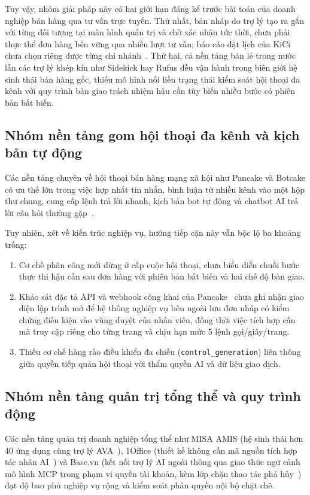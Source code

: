 Tuy vậy, nhóm giải pháp này có hai giới hạn đáng kể trước bài toán của doanh nghiệp bán hàng qua tư vấn trực tuyến. Thứ nhất, bản nháp do trợ lý tạo ra gắn với từng đối tượng tại màn hình quản trị và chờ xác nhận tức thời, chưa phải thực thể đơn hàng
bền vững qua nhiều lượt tư vấn; báo cáo đặt lịch của KiCi chưa chọn riêng được từng chi nhánh~\cite{kiotviet-kici}. Thứ hai, cả nền tảng bán lẻ trong nước
lẫn các trợ lý khép kín như Sidekick hay Rufus đều vận hành trong biên giới hệ sinh thái bán hàng gốc, thiếu mô hình nối liền trạng thái kiểm soát hội thoại đa kênh với quy trình bàn giao trách
nhiệm hậu cần tùy biến nhiều bước có phiên bản bất biến.

\subsection{Nhóm nền tảng gom hội thoại đa kênh và kịch bản tự động}
Các nền tảng chuyên về hội thoại bán hàng mạng xã hội như Pancake và Botcake có ưu thế lớn trong việc hợp nhất tin nhắn, bình luận từ nhiều kênh vào một hộp thư chung, cung cấp lệnh trả lời
nhanh, kịch bản bot tự động và chatbot AI trả lời câu hỏi thường gặp~\cite{botcake-messenger}.

Tuy nhiên, xét về kiến trúc nghiệp vụ, hướng tiếp cận này vẫn bộc lộ ba khoảng trống:
\begin{enumerate}
  \item Cơ chế phân công mới dừng ở cấp cuộc hội thoại, chưa biểu diễn chuỗi bước thực thi hậu cần sau đơn hàng với phiên bản bất biến và hai chế độ bàn giao.
  \item Khảo sát đặc tả API và webhook công khai của Pancake~\cite{pancake-api} chưa ghi nhận giao diện lập trình mở để hệ thống nghiệp vụ bên
    ngoài lưu đơn nháp có kiểm chứng điều kiện vào vùng duyệt của nhân viên, đồng thời việc tích hợp cần mã truy cập riêng cho từng trang và chịu hạn mức 5 lệnh
    gọi/giây/trang.
  \item Thiếu cơ chế hàng rào điều khiển đa chiều (\texttt{control\_\hspace{0pt}generation}) liên thông giữa quyền tiếp quản hội thoại với thẩm quyền AI và dữ liệu giao dịch.
\end{enumerate}

\subsection{Nhóm nền tảng quản trị tổng thể và quy trình động}
Các nền tảng quản trị doanh nghiệp tổng thể như MISA AMIS (hệ sinh thái hơn 40 ứng dụng cùng trợ lý AVA~\cite{misa-amis,misa-ava}), 1Office (thiết kế không cần mã nguồn tích hợp tác nhân AI~\cite{1office-ai})
và Base.vn (kết nối trợ lý AI ngoài thông qua giao thức ngữ cảnh mô hình MCP trong phạm vi quyền tài khoản, kèm lớp chặn thao tác phá hủy~\cite{base-mcp}) đạt độ bao phủ nghiệp vụ
rộng và kiểm soát phân quyền nội bộ chặt chẽ.

